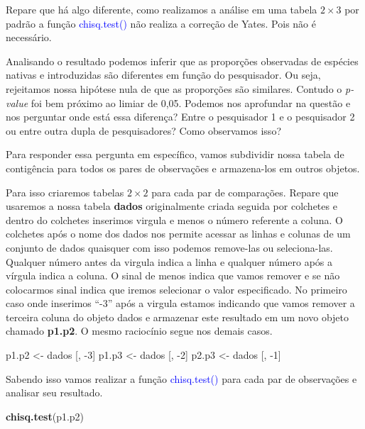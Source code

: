 \documentclass[14pt,titlepage, oneside, openany, a4paper]{book}
\newenvironment{Shaded}{\begin{snugshade}}{\end{snugshade}}
\newcommand{\DecValTok}[1]{\textcolor[rgb]{0.00,0.00,0.81}{#1}}
\newcommand{\KeywordTok}[1]{\textcolor[rgb]{0.13,0.29,0.53}{\textbf{#1}}}
\newcommand{\NormalTok}[1]{#1}
\newcommand{\StringTok}[1]{\textcolor[rgb]{0.31,0.60,0.02}{#1}}
\begin{document}
Repare que há algo diferente, como realizamos a análise em uma tabela \(2 \times 3\) por padrão a função \textcolor{blue}{chisq.test()} não realiza a correção de Yates. Pois não é necessário.

Analisando o resultado podemos inferir que as proporções observadas de espécies nativas e introduzidas são diferentes em função do pesquisador. Ou seja, rejeitamos nossa hipótese nula de que as proporções são similares. Contudo o \emph{p-value} foi bem próximo ao limiar de 0,05. Podemos nos aprofundar na questão e nos perguntar onde está essa diferença? Entre o pesquisador 1 e o pesquisador 2 ou entre outra dupla de pesquisadores? Como observamos isso?

Para responder essa pergunta em específico, vamos subdividir nossa tabela de contigência para todos os pares de observações e armazena-los em outros objetos.

Para isso criaremos tabelas \(2 \times 2\) para cada par de comparações. Repare que usaremos a nossa tabela \textbf{dados} originalmente criada seguida por colchetes e dentro do colchetes inserimos virgula e menos o número referente a coluna. O colchetes após o nome dos dados nos permite acessar as linhas e colunas de um conjunto de dados quaisquer com isso podemos remove-las ou seleciona-las. Qualquer número antes da virgula indica a linha e qualquer número após a vírgula indica a coluna. O sinal de menos indica que vamos remover e se não colocarmos sinal indica que iremos selecionar o valor especificado. No primeiro caso onde inserimos ``-3'' após a virgula estamos indicando que vamos remover a terceira coluna do objeto dados e armazenar este resultado em um novo objeto chamado \textbf{p1.p2}. O mesmo raciocínio segue nos demais casos.

\begin{Shaded}
\begin{Highlighting}[]
\NormalTok{p1.p2 <-}\StringTok{ }\NormalTok{dados [, }\DecValTok{-3}\NormalTok{]}
\NormalTok{p1.p3 <-}\StringTok{ }\NormalTok{dados [, }\DecValTok{-2}\NormalTok{]}
\NormalTok{p2.p3 <-}\StringTok{ }\NormalTok{dados [, }\DecValTok{-1}\NormalTok{]}
\end{Highlighting}
\end{Shaded}

Sabendo isso vamos realizar a função \textcolor{blue}{chisq.test()} para cada par de observações e analisar seu resultado.

\begin{Shaded}
\begin{Highlighting}[]
\KeywordTok{chisq.test}\NormalTok{(p1.p2)}
\end{Highlighting}
\end{Shaded}
\end{document}
